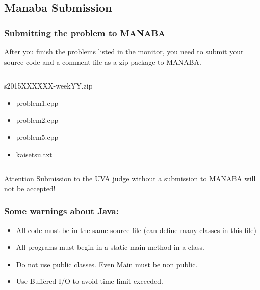 \documentclass{beamer}
\begin{document}
\subsection{Manaba Submission}
\begin{frame}
  \frametitle{Submitting the problem to MANABA}

  {\small
  After you finish the problems listed in the monitor, you need to
  submit your source code and a comment file as a zip package to MANABA.}

  \medskip

  {\small
  \begin{columns}
    \begin{block}{s2015XXXXXX-weekYY.zip}
      \begin{itemize}
      \item problem1.cpp
      \item problem2.cpp
      \item problem5.cpp
      \item kaisetsu.txt
      \end{itemize}
    \end{block}
  \end{columns}
  }

  \medskip
  
  \begin{alertblock}{Attention}
  Submission to the UVA judge without a submission to MANABA will not
  be accepted!
  \end{alertblock}
\end{frame}

\begin{frame}
  \frametitle{Some warnings about Java:}

  \begin{itemize}
  \item All code must be in the same source file (can define many
    classes in this file)

    \medskip

  \item All programs must begin in a static main method in a
     class.

    \medskip

  \item Do not use public classes. Even Main must be non public.

    \medskip

  \item Use Buffered I/O to avoid time limit exceeded.
  \end{itemize}
\end{frame}
\end{document}
